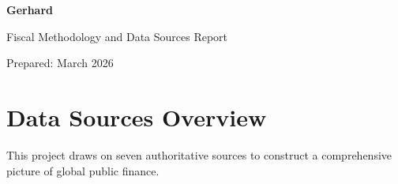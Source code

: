 \documentclass[11pt,letterpaper]{article}
\begin{document}
\begin{titlepage}
\centering
\vspace*{2cm}
{\Huge\bfseries Gerhard\par}
\vspace{1cm}
{\LARGE Fiscal Methodology and Data Sources Report\par}
\vfill
{\large Prepared: March 2026\par}
\end{titlepage}

\tableofcontents
\newpage

\section{Data Sources Overview}

This project draws on seven authoritative sources to construct a comprehensive picture of global public finance.
\end{document}
